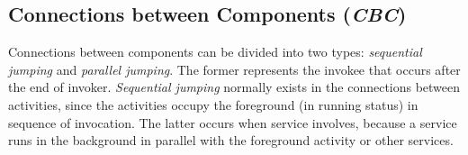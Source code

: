 



\subsection{Connections between Components (\textit{CBC})}
Connections between components can be divided into two types: \textit{sequential jumping} and \textit{parallel jumping}. The former represents the invokee that occurs after the end of invoker. \textit{Sequential jumping} normally exists in the connections between activities, since the activities occupy the foreground (in running status) in sequence of invocation. The latter occurs when service involves, because a service runs in the background in parallel with the foreground activity or other services.

